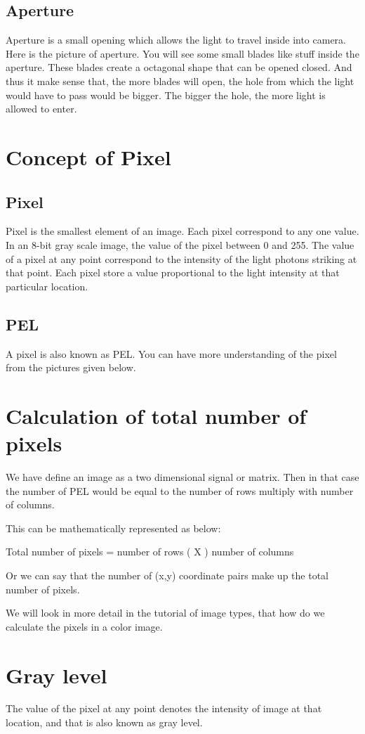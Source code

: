 \documentclass[a4paper]{article}
\begin{document}
  \subsection{Aperture}
  Aperture is a small opening which allows the light to travel inside into camera. Here is the picture of aperture.
You will see some small blades like stuff inside the aperture. These blades create a octagonal shape that can be opened closed. And thus it make sense that, the more blades will open, the hole from which the light would have to pass would be bigger. The bigger the hole, the more light is allowed to enter.
\newpage
\section{Concept of Pixel
}
\subsection{Pixel}
Pixel is the smallest element of an image. Each pixel correspond to any one value. In an 8-bit gray scale image, the value of the pixel between 0 and 255. The value of a pixel at any point correspond to the intensity of the light photons striking at that point. Each pixel store a value proportional to the light intensity at that particular location.

\subsection{PEL}
A pixel is also known as PEL. You can have more understanding of the pixel from the pictures given below.
\newpage
\section{Calculation of total number of pixels}
We have define an image as a two dimensional signal or matrix. Then in that case the number of PEL would be equal to the number of rows multiply with number of columns.

This can be mathematically represented as below:

Total number of pixels = number of rows ( X ) number of columns

Or we can say that the number of (x,y) coordinate pairs make up the total number of pixels.

We will look in more detail in the tutorial of image types, that how do we calculate the pixels in a color image.
\section{Gray level}
The value of the pixel at any point denotes the intensity of image at that location, and that is also known as gray level.
\end{document}
